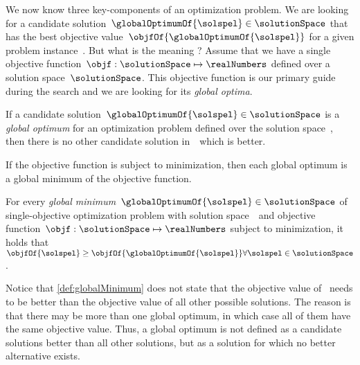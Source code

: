 %
%
We now know three key-components of an optimization problem.
We are looking for a candidate solution~$\globalOptimumOf{\solspel}\in\solutionSpace$ that has the best objective value~$\objfOf{\globalOptimumOf{\solspel}}$ for a given problem instance~\instance.
But what is the meaning ?%
%
%
%
Assume that we have a single objective function~$\objf:\solutionSpace\mapsto\realNumbers$ defined over a solution space~$\solutionSpace$.
This objective function is our primary guide during the search and we are looking for its \emph{global optima}.%
%
\begin{definition}%
\label{def:globalOptimum}%
If a candidate solution~$\globalOptimumOf{\solspel}\in\solutionSpace$ is a \emph{global optimum} for an optimization problem defined over the solution space~\solutionSpace, then there is no other candidate solution in~\solutionSpace\ which is better.%
\end{definition}%
%
If the objective function is subject to minimization, then each global optimum is a global minimum of the objective function.%
%
\begin{definition}%
\label{def:globalMinimum}%
For every \emph{global minimum}~$\globalOptimumOf{\solspel}\in\solutionSpace$ of single-objective optimization problem with solution space~\solutionSpace\ and objective function~$\objf:\solutionSpace\mapsto\realNumbers$ subject to minimization, it holds that $\objfOf{\solspel} \geq \objfOf{\globalOptimumOf{\solspel}} \forall \solspel \in \solutionSpace$.%
\end{definition}%
%
Notice that \cref{def:globalMinimum} does not state that the objective value of~\globalOptimumOf{\solspel} needs to be better than the objective value of all other possible solutions.
The reason is that there may be more than one global optimum, in which case all of them have the same objective value.
Thus, a global optimum is not defined as a candidate solutions better than all other solutions, but as a solution for which no better alternative exists.

